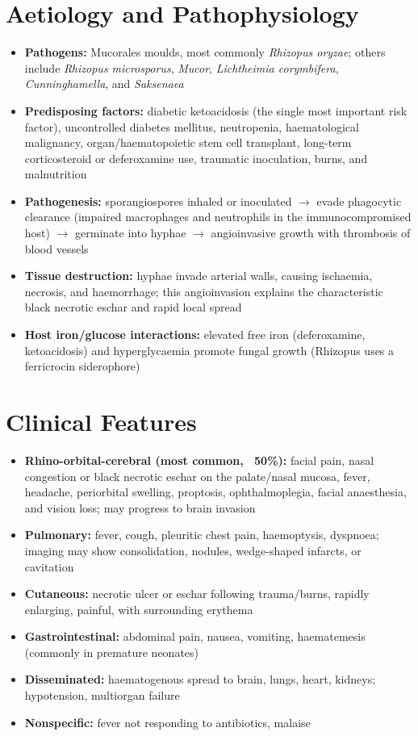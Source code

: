 \section*{Aetiology and Pathophysiology}
\begin{itemize}
    \item \textbf{Pathogens:} Mucorales moulds, most commonly \textit{Rhizopus oryzae}; others include \textit{Rhizopus microsporus}, \textit{Mucor}, \textit{Lichtheimia corymbifera}, \textit{Cunninghamella}, and \textit{Saksenaea}
    \item \textbf{Predisposing factors:} diabetic ketoacidosis (the single most important risk factor), uncontrolled diabetes mellitus, neutropenia, haematological malignancy, organ/haematopoietic stem cell transplant, long-term corticosteroid or deferoxamine use, traumatic inoculation, burns, and malnutrition
    \item \textbf{Pathogenesis:} sporangiospores inhaled or inoculated $\to$ evade phagocytic clearance (impaired macrophages and neutrophils in the immunocompromised host) $\to$ germinate into hyphae $\to$ angioinvasive growth with thrombosis of blood vessels
    \item \textbf{Tissue destruction:} hyphae invade arterial walls, causing ischaemia, necrosis, and haemorrhage; this angioinvasion explains the characteristic black necrotic eschar and rapid local spread
    \item \textbf{Host iron/glucose interactions:} elevated free iron (deferoxamine, ketoacidosis) and hyperglycaemia promote fungal growth (Rhizopus uses a ferricrocin siderophore)
\end{itemize}

\section*{Clinical Features}
\begin{itemize}
    \item \textbf{Rhino-orbital-cerebral (most common, ~50\%):} facial pain, nasal congestion or black necrotic eschar on the palate/nasal mucosa, fever, headache, periorbital swelling, proptosis, ophthalmoplegia, facial anaesthesia, and vision loss; may progress to brain invasion
    \item \textbf{Pulmonary:} fever, cough, pleuritic chest pain, haemoptysis, dyspnoea; imaging may show consolidation, nodules, wedge-shaped infarcts, or cavitation
    \item \textbf{Cutaneous:} necrotic ulcer or eschar following trauma/burns, rapidly enlarging, painful, with surrounding erythema
    \item \textbf{Gastrointestinal:} abdominal pain, nausea, vomiting, haematemesis (commonly in premature neonates)
    \item \textbf{Disseminated:} haematogenous spread to brain, lungs, heart, kidneys; hypotension, multiorgan failure
    \item \textbf{Nonspecific:} fever not responding to antibiotics, malaise
\end{itemize}

